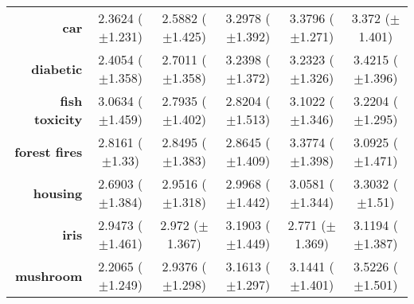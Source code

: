 \begin{table}[htb]
{\begin{tabular}{r|ccccc}
                  \textbf{car}                 & \cellcolor[rgb]{ .388,  .745,  .482}2.3624 ($\pm$1.231) & \cellcolor[rgb]{ .533,  .784,  .49}2.5882 ($\pm$1.425)  & \cellcolor[rgb]{ 1,  .922,  .518}3.2978 ($\pm$1.392)    & \cellcolor[rgb]{ .973,  .412,  .42}3.3796 ($\pm$1.271)  & \cellcolor[rgb]{ .976,  .459,  .431}3.372 ($\pm$1.401)  \\
                  \textbf{diabetic}            & \cellcolor[rgb]{ .388,  .745,  .482}2.4054 ($\pm$1.358) & \cellcolor[rgb]{ .604,  .808,  .494}2.7011 ($\pm$1.358) & \cellcolor[rgb]{ 1,  .902,  .518}3.2398 ($\pm$1.372)    & \cellcolor[rgb]{ 1,  .922,  .518}3.2323 ($\pm$1.326)    & \cellcolor[rgb]{ .973,  .412,  .42}3.4215 ($\pm$1.396)  \\
                  \textbf{fish toxicity}       & \cellcolor[rgb]{ 1,  .922,  .518}3.0634 ($\pm$1.459)    & \cellcolor[rgb]{ .388,  .745,  .482}2.7935 ($\pm$1.402) & \cellcolor[rgb]{ .447,  .761,  .482}2.8204 ($\pm$1.513) & \cellcolor[rgb]{ .996,  .796,  .494}3.1022 ($\pm$1.346) & \cellcolor[rgb]{ .973,  .412,  .42}3.2204 ($\pm$1.295)  \\
                  \textbf{forest fires}        & \cellcolor[rgb]{ .388,  .745,  .482}2.8161 ($\pm$1.33)  & \cellcolor[rgb]{ .808,  .867,  .506}2.8495 ($\pm$1.383) & \cellcolor[rgb]{ 1,  .922,  .518}2.8645 ($\pm$1.409)    & \cellcolor[rgb]{ .973,  .412,  .42}3.3774 ($\pm$1.398)  & \cellcolor[rgb]{ .988,  .698,  .475}3.0925 ($\pm$1.471) \\
                  \textbf{housing}             & \cellcolor[rgb]{ .388,  .745,  .482}2.6903 ($\pm$1.384) & \cellcolor[rgb]{ .91,  .894,  .51}2.9516 ($\pm$1.318)   & \cellcolor[rgb]{ 1,  .922,  .518}2.9968 ($\pm$1.442)    & \cellcolor[rgb]{ .996,  .82,  .498}3.0581 ($\pm$1.344)  & \cellcolor[rgb]{ .973,  .412,  .42}3.3032 ($\pm$1.51)   \\
                  \textbf{iris}                & \cellcolor[rgb]{ .922,  .898,  .51}2.9473 ($\pm$1.461)  & \cellcolor[rgb]{ 1,  .922,  .518}2.972 ($\pm$1.367)     & \cellcolor[rgb]{ .973,  .412,  .42}3.1903 ($\pm$1.449)  & \cellcolor[rgb]{ .388,  .745,  .482}2.771 ($\pm$1.369)  & \cellcolor[rgb]{ .984,  .58,  .455}3.1194 ($\pm$1.387)  \\
                  \textbf{mushroom}            & \cellcolor[rgb]{ .388,  .745,  .482}2.2065 ($\pm$1.249) & \cellcolor[rgb]{ .863,  .882,  .51}2.9376 ($\pm$1.298)  & \cellcolor[rgb]{ 1,  .902,  .514}3.1613 ($\pm$1.297)    & \cellcolor[rgb]{ 1,  .922,  .518}3.1441 ($\pm$1.401)    & \cellcolor[rgb]{ .973,  .412,  .42}3.5226 ($\pm$1.501)  \\

\end{tabular}}
\end{table}
